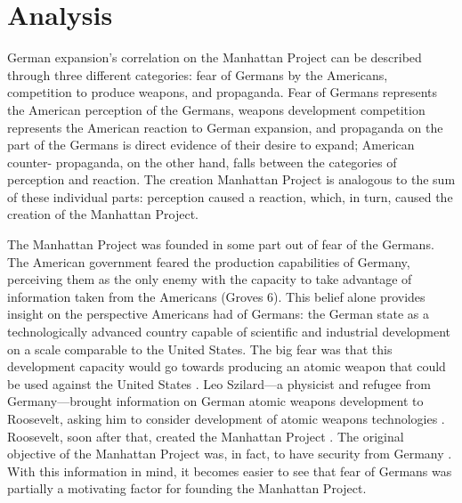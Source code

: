 \documentclass[a4paper,12pt]{article}
\begin{document}
    \section{Analysis}

        German expansion's correlation on the Manhattan Project can be described through three
        different categories: fear of Germans by the Americans, competition to produce weapons, and
        propaganda. Fear of Germans represents the American perception of the Germans, weapons
        development competition represents the American reaction to German expansion, and propaganda
        on the part of the Germans is direct evidence of their desire to expand; American counter-
        propaganda, on the other hand, falls between the categories of perception and reaction. The
        creation Manhattan Project is analogous to the sum of these individual parts: perception
        caused a reaction, which, in turn, caused the creation of the Manhattan Project.

        The Manhattan Project was founded in some part out of fear of the Germans. The American
        government feared the production capabilities of Germany, perceiving them as the only enemy
        with the capacity to take advantage of information taken from the Americans (Groves 6). This
        belief alone provides insight on the perspective Americans had of Germans: the German state
        as a technologically advanced country capable of scientific and industrial development on a
        scale comparable to the United States. The big fear was that this development capacity would
        go towards producing an atomic weapon that could be used against the United States
        \cite[136]{stoffm}. Leo Szilard---a physicist and refugee from Germany---brought information
        on German atomic weapons development to Roosevelt, asking him to consider development of
        atomic weapons technologies \cite[12]{norrism}. Roosevelt, soon after that, created the
        Manhattan Project \cite[12]{norrism}. The original objective of the Manhattan Project was,
        in fact, to have security from Germany \cite[140]{grovesl}. With this information in mind,
        it becomes easier to see that fear of Germans was partially a motivating factor for founding
        the Manhattan Project.
\end{document}
